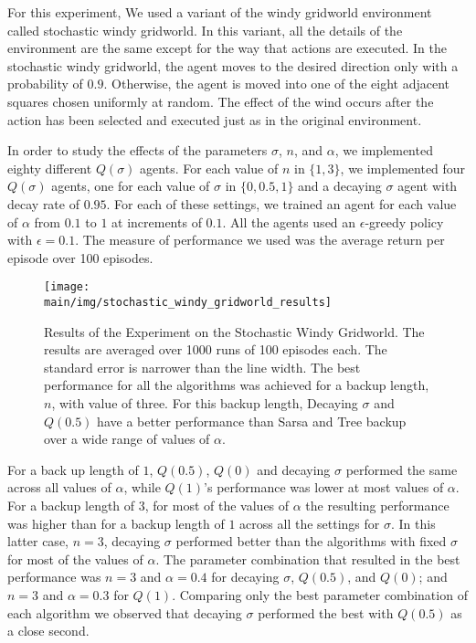 For this experiment, We used a variant of the windy gridworld environment called stochastic windy gridworld.
In this variant, all the details of the environment are the same except for the way that actions are executed.
In the stochastic windy gridworld, the agent moves to the desired direction only with a probability of $0.9$.
Otherwise, the agent is moved into one of the eight adjacent squares chosen uniformly at random.
The effect of the wind occurs after the action has been selected and executed just as in the original environment.

In order to study the effects of the parameters $\sigma$, $n$, and $\alpha$, we implemented eighty different $Q(\sigma)$ agents.
For each value of $n$ in $\{1 , 3\}$, we implemented four $Q(\sigma)$ agents, one for each value of $\sigma$ in $\{0, 0.5, 1\}$ and a decaying $\sigma$ agent with decay rate of $0.95$.
For each of these settings, we trained an agent for each value of $\alpha$ from $0.1$ to $1$ at increments of $0.1$. 
All the agents used an $\epsilon$-greedy policy with $\epsilon = 0.1$.
The measure of performance we used was the average return per episode over 100 episodes.

\begin{figure}[t]
    \centering
    \texttt{[image: \\main/img/stochastic\_windy\_gridworld\_results]}
    \caption[Results of the Experiment on the Stochastic Windy Gridworld] {
    Results of the Experiment on the Stochastic Windy Gridworld.
    The results are averaged over 1000 runs of 100 episodes each.
    The standard error is narrower than the line width.
    The best performance for all the algorithms was achieved for a backup length, $n$, with value of three.
    For this backup length, Decaying $\sigma$ and $Q(0.5)$ have a better performance than Sarsa and Tree backup over a wide range of values of $\alpha$.
    }
    \label{fig:stochastic_wind_gridworld_results}
\end{figure}

For a back up length of $1$, $Q(0.5)$, $Q(0)$ and decaying $\sigma$ performed the same across all values of $\alpha$, while $Q(1)$'s performance was lower at most values of $\alpha$.
For a backup length of $3$, for most of the values of $\alpha$ the resulting performance was higher than for a backup length of $1$ across all the settings for $\sigma$.
In this latter case, $n = 3$, decaying $\sigma$ performed better than the algorithms with fixed $\sigma$ for most of the values of $\alpha$.
The parameter combination that resulted in the best performance was $n = 3$ and $\alpha = 0.4$ for decaying $\sigma$, $Q(0.5)$, and $Q(0)$; and $n = 3$ and $\alpha = 0.3$ for $Q(1)$.
Comparing only the best parameter combination of each algorithm we observed that decaying $\sigma$ performed the best with $Q(0.5)$ as a close second.

